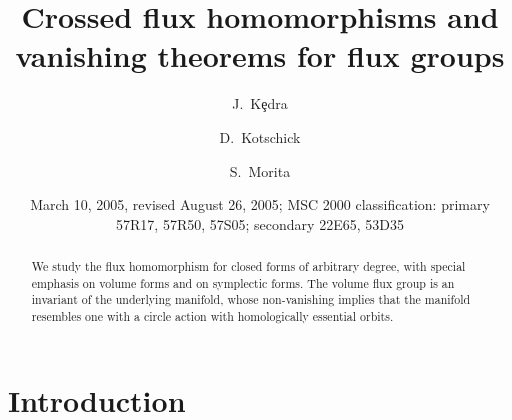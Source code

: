 \documentclass[12pt]{amsart}
\theoremstyle{definition}
\theoremstyle{remark}
\begin{document}
\title[Vanishing theorems for flux groups]{Crossed flux homomorphisms and\\ 
vanishing theorems for flux groups}
\author{J.~K\c edra}
\address{Institute of Mathematics, University of Szczecin, Wielkopolska~15, 70-451 Szczecin,
Poland; and Mathematical Sciences, University of Aberdeen, Meston Building, King's College,
Aberdeen AB24 3UE, Scotland, UK}
\author{D.~Kotschick}
\address{Mathematisches Institut, Ludwig-Maximilians-Universit\"at M\"unchen,
Theresienstr.~39, 80333 M\"unchen, Germany}
\author{S.~Morita}
\address{Department of Mathematical Sciences\\
University of Tokyo \\Komaba, Tokyo 153-8914\\
Japan}

\date{March 10, 2005, revised August 26, 2005; MSC 2000 classification: primary 57R17, 57R50, 57S05;
secondary 22E65, 53D35}

\begin{abstract}
We study the flux homomorphism for closed forms of arbitrary degree, 
with special emphasis on volume forms and on symplectic forms. The 
volume flux group is an invariant of the underlying manifold, whose 
non-vanishing implies that the manifold resembles one with a circle action 
with homologically essential orbits.
\end{abstract}

\maketitle

\section{Introduction}
\end{document}
